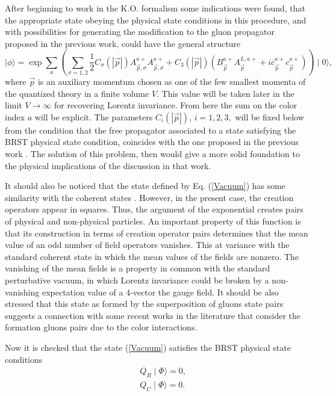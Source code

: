 \documentclass[12pt,letterpaper]{report}
\begin{document}
After beginning to work in the K.O. formalism some indications
were found, that the appropriate state obeying the physical state
conditions in this procedure, and with possibilities for
generating the modification to the gluon propagator proposed in
the previous work, could have the general structure
\begin{equation}
\mid \phi \rangle =\exp \sum\limits_a\left(\sum\limits_{\sigma
=1,2}\frac 12C_\sigma \left(\left| \vec{p}\right| \right)
A_{\vec{p},\sigma }^{a+}A_{ \vec{p},\sigma }^{a+}+C_3\left(\left|
\vec{p}\right| \right) \left(B_{\vec{
p}}^{a+}A_{\vec{p}}^{L,a+}+i\overline{c}_{\vec{p}}^{a+}c_{\vec{p}
}^{a+}\right) \right) \mid 0\rangle, \label{Vacuum}
\end{equation}
where $\vec{p}$ is an auxiliary momentum chosen as one of the few
smallest momenta of the quantized theory in a finite volume $V$.
This value will be taken later in the limit $V\rightarrow \infty $
for recovering Lorentz invariance. From here the sum on the color
index $a$ will be explicit. The parameters $C_i\left(\left|
\vec{p}\right| \right)$, $i=1,2,3,$ will be fixed below from the
condition that the free propagator associated to a state
satisfying the BRST physical state condition, coincides with the
one proposed in the previous work \cite{Cabo}. The solution of
this problem, then would give a more solid foundation to the
physical implications of the discussion in that work.

It should also be noticed that the state defined by Eq.
(\ref{Vacuum}) has some similarity with the coherent states
\cite{Itzykson}. However, in the present case, the creation
operators appear in squares. Thus, the argument of the exponential
creates pairs of physical and non-physical particles. An important
property of this function is that its construction in terms of
creation operator pairs determines that the mean value of an odd
number of field operators vanishes. This at variance with the
standard coherent state in which the mean values of the fields are
nonzero. The vanishing of the mean fields is a property in common
with the standard perturbative vacuum, in which Lorentz invariance
could be broken by a non-vanishing expectation value of a 4-vector
the gauge field. It should be also stressed that this state as
formed by the superposition of gluons state pairs suggests a
connection with some recent works in the literature that consider
the formation gluons pairs due to the color interactions.

Now it is checked that the state (\ref{Vacuum}) satisfies the BRST
physical state conditions
\begin{eqnarray}
&&Q_B\mid \Phi \rangle =0, \nonumber \\ &&Q_C\mid \Phi \rangle =0.
\end{eqnarray}
\end{document}

